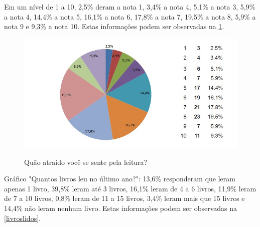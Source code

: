 \documentclass[
	article,			%
	11pt,				%
	oneside,			%
	a4paper,			%
	english,			%
	brazil,				%
	sumario=tradicional
	]{abntex2}
\begin{document}
Em um nível de 1 a 10, 2,5\% deram a nota 1, 3,4\% a nota 4, 5,1\% a nota 3, 5,9\% a nota 4, 14,4\% a nota 5, 16,1\% a nota 6, 17,8\% a nota 7, 19,5\% a nota 8, 5,9\% a nota 9 e 9,3\% a nota 10. Estas informações podem ser observadas na \figurename{ \ref{atraido}}.

\begin{figure}[h]  
	\begin{center} 
		\begin{center}
			\changecaptionwidth 
			\captionwidth{13.5cm} %
			\caption{\label{atraido} Quão atraído você se sente pela leitura?}
			{\includegraphics[scale=0.8]{imagens/atraido}}
		\end{center}
	\end{center}
\end{figure}
\FloatBarrier


Gráfico "Quantos livros leu no último ano?":
13,6\% responderam que leram apenas 1 livro, 39,8\% leram até 3 livros, 16,1\% leram de 4 a 6 livros, 11,9\% leram de 7 a 10 livros, 0,8\% leram de 11 a 15 livros, 3,4\% leram mais que 15 livros e 14,4\% não leram nenhum livro. Estas informações podem ser observadas na \figurename{ \ref{livroslidos}}.
\end{document}
